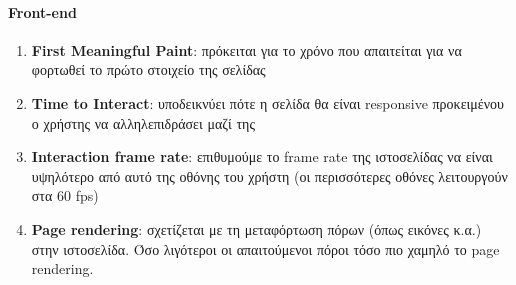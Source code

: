 \paragraph*{Front-end}
\begin{enumerate}
	\item \textbf{First Meaningful Paint}: πρόκειται για το χρόνο που απαιτείται για να φορτωθεί το πρώτο στοιχείο της σελίδας
	\item \textbf{Time to Interact}: υποδεικνύει πότε η σελίδα θα είναι responsive προκειμένου ο χρήστης να αλληλεπιδράσει μαζί της
	\item \textbf{Interaction frame rate}: επιθυμούμε το frame rate της ιστοσελίδας να είναι υψηλότερο από αυτό της οθόνης του χρήστη (οι περισσότερες οθόνες λειτουργούν στα 60 fps)
	\item \textbf{Page rendering}: σχετίζεται με τη μεταφόρτωση πόρων (όπως εικόνες κ.α.) στην ιστοσελίδα. Όσο λιγότεροι οι απαιτούμενοι πόροι τόσο πιο χαμηλό το page rendering.
\end{enumerate}

